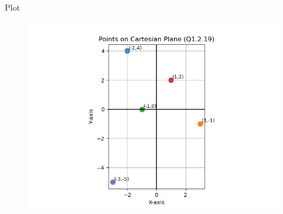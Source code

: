 \documentclass{beamer}
\begin{document}
\begin{frame}{Plot}
    \begin{figure}[h!]
    \centering
    \includegraphics[height=0.6\textheight, keepaspectratio]{figs/Figure1.png}
    \label{figure_1}
\end{figure}
\end{frame}
\end{document}
